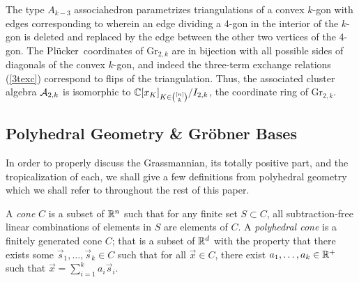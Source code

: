 \documentclass[12pt,letter]{article}
\newcommand{\gr}{\mathrm{Gr}}
\newcommand{\plu}{Pl\"ucker~}
\begin{document}
\begin{example}
 The type $A_{k-3}$ associahedron parametrizes triangulations of a convex $k$-gon with edges corresponding to  wherein an edge dividing a 4-gon in the interior of the $k$-gon is deleted and replaced by the edge between the other two vertices of the 4-gon. The \plu coordinates of $\gr_{2,k}$ are in bijection with all possible sides of diagonals of the convex $k$-gon, and indeed the three-term exchange relations (\ref{3texc}) correspond to flips of the triangulation. Thus, the associated cluster algebra ${\mathcal A}_{2,k}$ is isomorphic to ${\mathbb C}[x_{K}]_{K\in {[n]\choose k}}/I_{2,k}$, the coordinate ring of $\gr_{2,k}$.\label{trian}
\end{example}


\subsection{Polyhedral Geometry \& Gr\"obner Bases}
In order to properly discuss the Grassmannian, its totally positive part, and the tropicalization of each, we shall give a few definitions from polyhedral geometry which we shall refer to throughout the rest of this paper.

\begin{definition}
A \emph{cone} $C$ is a subset of ${\mathbb R}^n$ such that for any finite set $S\subset  C$, all subtraction-free linear combinations of elements in $S$ are elements of $C$. A \emph{polyhedral cone} is a finitely generated cone $C$; that is a subset of ${\mathbb R}^d$ with the property that there exists some $\vec{s}_1,\hdots,\vec{s}_k\in C$ such that for all $\vec{x}\in C$, there exist $a_1,\hdots,a_k\in {\mathbb R}^+$ such that $\vec{x}=\sum_{i=1}^k a_i\vec{s}_i$. 
\end{definition}
\end{document}
